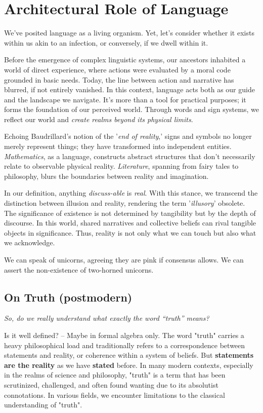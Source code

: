 \documentclass[11pt,a4]{article}
\begin{document}
\section{Architectural Role of Language}

We've posited language as a living organism. Yet, let's consider whether it exists within us akin to an infection, or conversely, if we dwell within it.
\par
Before the emergence of complex linguistic systems, our ancestors inhabited a world of direct experience, where actions were evaluated by a moral code grounded in basic needs. Today, the line between action and narrative has blurred, if not entirely vanished. In this context, language acts both as our guide and the landscape we navigate. It's more than a tool for practical purposes; it forms the foundation of our perceived world. Through words and sign systems, we reflect our world and \textit{create realms beyond its physical limits}.

\par
Echoing Baudrillard's notion of the '\textit{end of reality},' signs and symbols no longer merely represent things; they have transformed into independent entities.
\textit{Mathematics}, as a language, constructs abstract structures that don't necessarily relate to observable physical reality. \textit{Literature}, spanning from fairy tales to philosophy, blurs the boundaries between reality and imagination.

\par
In our definition, anything\textit{ discuss-able} is \textit{real}. With this stance, we transcend the distinction between illusion and reality, rendering the term '\textit{illusory}' obsolete. The significance of existence is not determined by tangibility but by the depth of discourse. In this world, shared narratives and collective beliefs can rival tangible objects in significance. Thus, reality is not only what we can touch but also what we acknowledge.
\par
We can speak of unicorns, agreeing they are pink if consensus allows. We can assert the non-existence of two-horned unicorns.

\subsection{On Truth (postmodern)}


\par
\textit{So, do we really understand what exactly the word “truth” means?} \\
\par
Is it well defined? -- Maybe in formal algebra only. The word "truth" carries a heavy philosophical load and traditionally refers to a correspondence between statements and reality, or coherence within a system of beliefs. But \textbf{statements are the reality} as we have \textbf{stated} before.
In many modern contexts, especially in the realms of science and philosophy, "truth" is a term that has been scrutinized, challenged, and often found wanting due to its absolutist connotations.
In various fields, we encounter limitations to the classical understanding of "truth".
\end{document}
